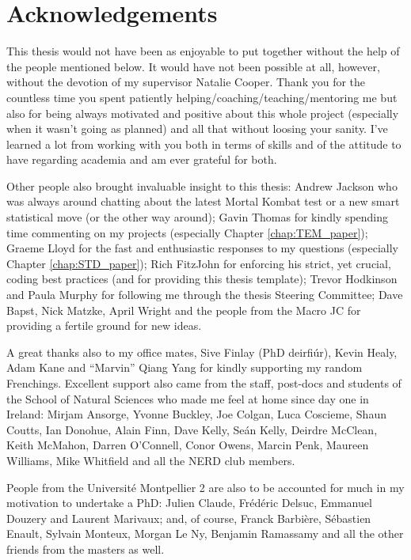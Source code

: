 \chapter*{Acknowledgements}

This thesis would not have been as enjoyable to put together without the help of the people mentioned below.
It would have not been possible at all, however, without the devotion of my supervisor Natalie Cooper.
Thank you for the countless time you spent patiently helping/coaching/teaching/mentoring me but also for being always motivated and positive about this whole project (especially when it wasn't going as planned) and all that without loosing your sanity.
I've learned a lot from working with you both in terms of skills and of the attitude to have regarding academia and am ever grateful for both.

Other people also brought invaluable insight to this thesis:
Andrew Jackson who was always around chatting about the latest Mortal Kombat test or a new smart statistical move (or the other way around);
Gavin Thomas for kindly spending time commenting on my projects (especially Chapter \ref{chap:TEM_paper});
Graeme Lloyd for the fast and enthusiastic responses to my questions (especially Chapter \ref{chap:STD_paper});
Rich FitzJohn for enforcing his strict, yet crucial, coding best practices (and for providing this thesis template);
Trevor Hodkinson and Paula Murphy for following me through the thesis Steering Committee;
Dave Bapst, Nick Matzke, April Wright and the people from the Macro JC for providing a fertile ground for new ideas.

A great thanks also to my office mates, Sive Finlay (PhD deirfi\'{u}r), Kevin Healy, Adam Kane and ``Marvin'' Qiang Yang for kindly supporting my random Frenchings.
Excellent support also came from the staff, post-docs and students of the School of Natural Sciences who made me feel at home since day one in Ireland:
Mirjam Ansorge, Yvonne Buckley, Joe Colgan, Luca Coscieme, Shaun Coutts, Ian Donohue, Alain Finn, Dave Kelly, Se\'{a}n Kelly, Deirdre McClean, Keith McMahon, Darren O'Connell, Conor Owens, Marcin Penk, Maureen Williams, Mike Whitfield and all the NERD club members.

People from the Universit\'{e} Montpellier 2 are also to be accounted for much in my motivation to undertake a PhD: %
Julien Claude, Fr\'{e}d\'{e}ric Delsuc, Emmanuel Douzery and Laurent Marivaux;
and, of course, Franck Barbi\`{e}re, S\'{e}bastien Enault, Sylvain Monteux, Morgan Le Ny, Benjamin Ramassamy and all the other friends from the masters as well.


